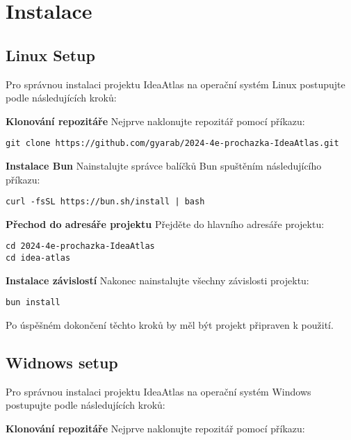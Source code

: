 \section{Instalace}
\subsection{Linux Setup}

Pro správnou instalaci projektu IdeaAtlas na operační systém Linux postupujte podle následujících kroků:

\textbf{Klonování repozitáře}
\newline
Nejprve naklonujte repozitář pomocí příkazu:

\begin{lstlisting}[style= bash]
git clone https://github.com/gyarab/2024-4e-prochazka-IdeaAtlas.git
\end{lstlisting}

\textbf{Instalace Bun}
\newline
Nainstalujte správce balíčků Bun spuštěním následujícího příkazu:

\begin{lstlisting}[style= bash]
curl -fsSL https://bun.sh/install | bash
\end{lstlisting}

\textbf{Přechod do adresáře projektu}
\newline
Přejděte do hlavního adresáře projektu:

\begin{lstlisting}[style= bash]
cd 2024-4e-prochazka-IdeaAtlas
cd idea-atlas
\end{lstlisting}

\textbf{Instalace závislostí}
\newline
Nakonec nainstalujte všechny závislosti projektu:

\begin{lstlisting}[style= bash]
bun install
\end{lstlisting}

Po úspěšném dokončení těchto kroků by měl být projekt připraven k použití.

\newpage
\subsection{Widnows setup}
Pro správnou instalaci projektu IdeaAtlas na operační systém Windows postupujte podle následujících kroků:

\textbf{Klonování repozitáře}
\newline
Nejprve naklonujte repozitář pomocí příkazu:

